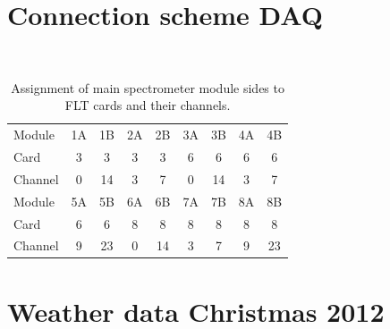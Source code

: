 \section{Connection scheme DAQ}
\
\begin{table}
  	\centering
  	\begin{tabular}{| l | c c | c c | c c | c c |}
  	\hline
  		Module	& 1A	& 1B	& 2A	& 2B	& 3A	& 3B	& 4A	& 4B 	\\
  		Card	& 3	& 3	& 3	& 3	& 6	& 6	& 6	& 6	\\
  		Channel	& 0	& 14	& 3	& 7	& 0	& 14	& 3	& 7	\\
  		\hline \hline
  		Module	&5A	& 5B	& 6A	& 6B	& 7A	& 7B	& 8A	& 8B	\\
  		Card	& 6	& 6	& 8	& 8	& 8	& 8	& 8	& 8	\\
  		Channel	& 9	& 23	& 0	& 14	& 3	& 7	& 9	& 23	\\
  		\hline
  	\end{tabular}
  	\caption[Main spectrometer DAQ channel assignment]{Assignment of main spectrometer module sides to FLT cards and their channels.}
  	\label{tab:connectionsModulesCards}
  \end{table}

% 
% 
% 


\section{Weather data Christmas 2012}
\label{ch:annex:sec:weather}

